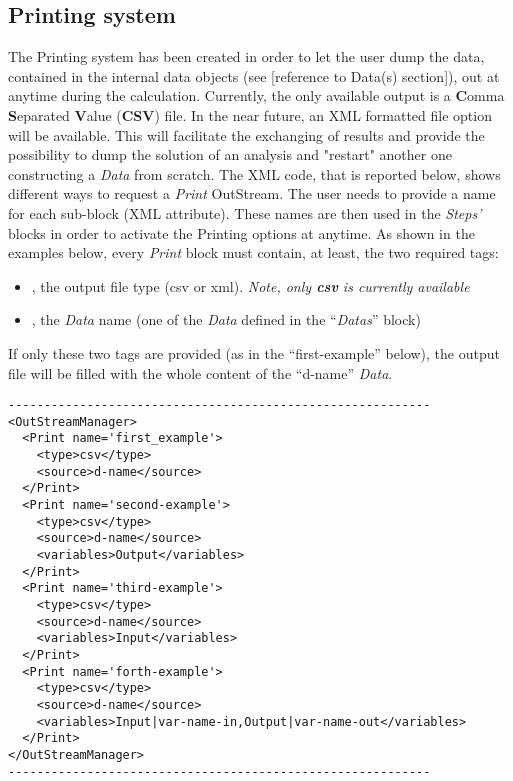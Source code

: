 \subsection{Printing system \label{sec:printing}}
The Printing system has been created in order to let the user dump the data,
contained in the internal data objects (see [reference to Data(s) section]), out
at anytime during the calculation.
%
Currently, the only available output is a \textbf{C}omma \textbf{S}eparated
\textbf{V}alue (\textbf{CSV}) file.
%
In the near future, an XML formatted file option will be available.
%
This will facilitate the exchanging of results and provide the possibility to
dump the solution of an analysis and "restart" another one constructing a
\textit{Data} from scratch.
%
The XML code, that is reported below, shows different ways to request a
\textit{Print} OutStream.
%
The user needs to provide a name for each sub-block (XML attribute).
%
These names are then used in the \textit{Steps'} blocks in order to activate the
Printing options at anytime.
%
As shown in the examples below, every \textit{Print} block must contain, at
least, the two required tags:
\vspace{-5mm}
\begin{itemize}
  \itemsep0em
  \item {}, the output file type (csv or xml).
  \textit{Note, only \textbf{csv} is currently available}
  \item {}, the \textit{Data} name (one of the \textit{Data} defined in
  the ``\textit{Datas}'' block)
\end{itemize}
\vspace{-5mm}
If only these two tags are provided (as in the ``first-example'' below), the
output file will be filled with the whole content of the ``d-name''
\textit{Data}.
%
\begin{lstlisting}[style=XML]
-----------------------------------------------------------
<OutStreamManager>
  <Print name='first_example'>
    <type>csv</type>
    <source>d-name</source>
  </Print>
  <Print name='second-example'>
    <type>csv</type>
    <source>d-name</source>
    <variables>Output</variables>
  </Print>
  <Print name='third-example'>
    <type>csv</type>
    <source>d-name</source>
    <variables>Input</variables>
  </Print>
  <Print name='forth-example'>
    <type>csv</type>
    <source>d-name</source>
    <variables>Input|var-name-in,Output|var-name-out</variables>
  </Print>
</OutStreamManager>
-----------------------------------------------------------
\end{lstlisting}
